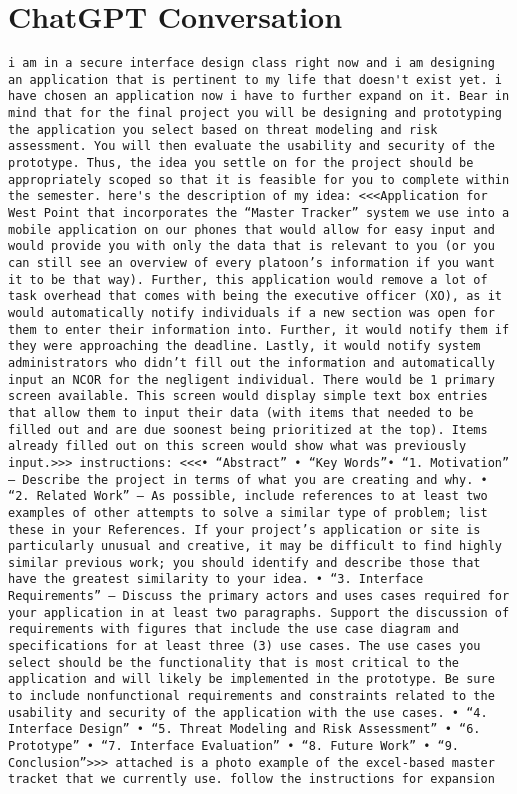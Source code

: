 \documentclass [11pt]{article}
\begin{document}
\appendix
\section{ChatGPT Conversation}
\begin{lstlisting}
i am in a secure interface design class right now and i am designing an application that is pertinent to my life that doesn't exist yet. i have chosen an application now i have to further expand on it. Bear in mind that for the final project you will be designing and prototyping the application you select based on threat modeling and risk assessment. You will then evaluate the usability and security of the prototype. Thus, the idea you settle on for the project should be appropriately scoped so that it is feasible for you to complete within the semester. here's the description of my idea: <<<Application for West Point that incorporates the “Master Tracker” system we use into a mobile application on our phones that would allow for easy input and would provide you with only the data that is relevant to you (or you can still see an overview of every platoon’s information if you want it to be that way). Further, this application would remove a lot of task overhead that comes with being the executive officer (XO), as it would automatically notify individuals if a new section was open for them to enter their information into. Further, it would notify them if they were approaching the deadline. Lastly, it would notify system administrators who didn’t fill out the information and automatically input an NCOR for the negligent individual. There would be 1 primary screen available. This screen would display simple text box entries that allow them to input their data (with items that needed to be filled out and are due soonest being prioritized at the top). Items already filled out on this screen would show what was previously input.>>> instructions: <<<• “Abstract” • “Key Words”• “1. Motivation” – Describe the project in terms of what you are creating and why. • “2. Related Work” – As possible, include references to at least two examples of other attempts to solve a similar type of problem; list these in your References. If your project’s application or site is particularly unusual and creative, it may be difficult to find highly similar previous work; you should identify and describe those that have the greatest similarity to your idea. • “3. Interface Requirements” – Discuss the primary actors and uses cases required for your application in at least two paragraphs. Support the discussion of requirements with figures that include the use case diagram and specifications for at least three (3) use cases. The use cases you select should be the functionality that is most critical to the application and will likely be implemented in the prototype. Be sure to include nonfunctional requirements and constraints related to the usability and security of the application with the use cases. • “4. Interface Design” • “5. Threat Modeling and Risk Assessment” • “6. Prototype” • “7. Interface Evaluation” • “8. Future Work” • “9. Conclusion”>>> attached is a photo example of the excel-based master tracket that we currently use. follow the instructions for expansion

\end{lstlisting}
\end{document}
